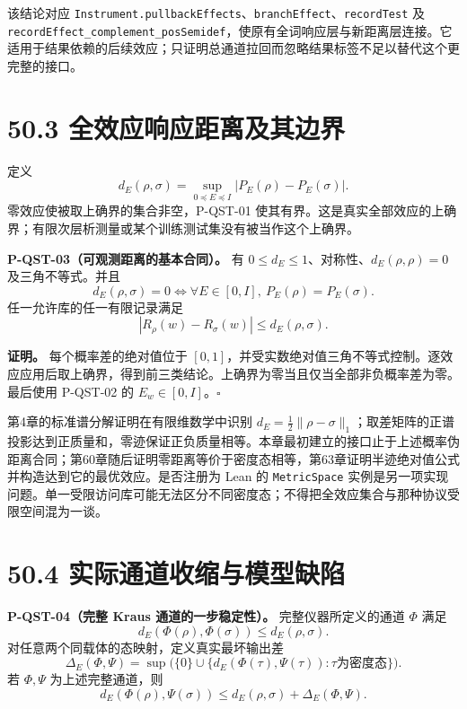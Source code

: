 \documentclass[
  11pt,
  oneside]{book}
\begin{document}
该结论对应
\texttt{Instrument.\allowbreak pullback\allowbreak Effects}、\allowbreak \texttt{branch\allowbreak Effect}、\allowbreak \texttt{record\allowbreak Test}
及
\texttt{record\allowbreak Effect\_\allowbreak complement\_\allowbreak pos\allowbreak Semidef}，使原有全词响应层与新距离层连接。它适用于结果依赖的后续效应；只证明总通道拉回而忽略结果标签不足以替代这个更完整的接口。

\section{50.3 全效应响应距离及其边界}

定义 \[
d_E(\rho,\sigma)=\sup_{0\preceq E\preceq I}|P_E(\rho)-P_E(\sigma)|.
\] 零效应使被取上确界的集合非空，P-QST-01
使其有界。这是真实全部效应的上确界；有限次层析测量或某个训练测试集没有被当作这个上确界。

\protect\hypertarget{p-qst-03}{}{}

\textbf{P-QST-03（可观测距离的基本合同）。} 有
\(0\le d_E\le1\)、对称性、\(d_E(\rho,\rho)=0\) 及三角不等式。并且 \[
d_E(\rho,\sigma)=0
\iff \forall E\in[0,I],\ P_E(\rho)=P_E(\sigma).
\] 任一允许库的任一有限记录满足 \[
|R_\rho(w)-R_\sigma(w)|\le d_E(\rho,\sigma).
\]

\textbf{证明。} 每个概率差的绝对值位于
\([0,1]\)，并受实数绝对值三角不等式控制。逐效应应用后取上确界，得到前三类结论。上确界为零当且仅当全部非负概率差为零。最后使用
P-QST-02 的 \(E_w\in[0,I]\)。\(\square\)

第4章的标准谱分解证明在有限维数学中识别
\(d_E=\tfrac12\|\rho-\sigma\|_1\)；取差矩阵的正谱投影达到正质量和，零迹保证正负质量相等。本章最初建立的接口止于上述概率伪距离合同；第60章随后证明零距离等价于密度态相等，第63章证明半迹绝对值公式并构造达到它的最优效应。是否注册为
Lean 的 \texttt{Metric\allowbreak Space}
实例是另一项实现问题。单一受限访问库可能无法区分不同密度态；不得把全效应集合与那种协议受限空间混为一谈。

\section{50.4 实际通道收缩与模型缺陷}

\protect\hypertarget{p-qst-04}{}{}

\textbf{P-QST-04（完整 Kraus 通道的一步稳定性）。} 完整仪器所定义的通道
\(\Phi\) 满足 \[
d_E(\Phi(\rho),\Phi(\sigma))\le d_E(\rho,\sigma).
\] 对任意两个同载体的态映射，定义真实最坏输出差 \[
\Delta_E(\Phi,\Psi)=\sup\bigl(\{0\}\cup
\{d_E(\Phi(\tau),\Psi(\tau)):\tau\text{为密度态}\}\bigr).
\] 若 \(\Phi,\Psi\) 为上述完整通道，则 \[
d_E(\Phi(\rho),\Psi(\sigma))
\le d_E(\rho,\sigma)+\Delta_E(\Phi,\Psi).
\]
\end{document}
